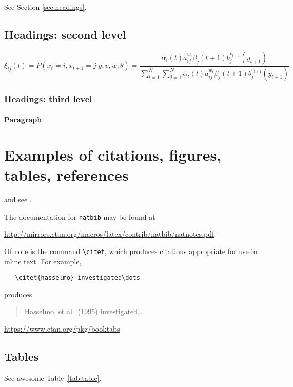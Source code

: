 \documentclass{article}
\begin{document}
\lipsum[4] See Section \ref{sec:headings}.

\subsection{Headings: second level}
\lipsum[5]
\begin{equation}
\xi _{ij}(t)=P(x_{t}=i,x_{t+1}=j|y,v,w;\theta)= {\frac {\alpha _{i}(t)a^{w_t}_{ij}\beta _{j}(t+1)b^{v_{t+1}}_{j}(y_{t+1})}{\sum _{i=1}^{N} \sum _{j=1}^{N} \alpha _{i}(t)a^{w_t}_{ij}\beta _{j}(t+1)b^{v_{t+1}}_{j}(y_{t+1})}}
\end{equation}

\subsubsection{Headings: third level}
\lipsum[6]

\paragraph{Paragraph}
\lipsum[7]

\section{Examples of citations, figures, tables, references}
\label{sec:others}
\lipsum[8] \cite{kour2014real,kour2014fast} and see \cite{hadash2018estimate}.

The documentation for \verb+natbib+ may be found at
\begin{center}
  \url{http://mirrors.ctan.org/macros/latex/contrib/natbib/natnotes.pdf}
\end{center}
Of note is the command \verb+\citet+, which produces citations
appropriate for use in inline text.  For example,
\begin{verbatim}
   \citet{hasselmo} investigated\dots
\end{verbatim}
produces
\begin{quote}
  Hasselmo, et al.\ (1995) investigated\dots
\end{quote}

\begin{center}
  \url{https://www.ctan.org/pkg/booktabs}
\end{center}

\subsection{Tables}
\lipsum[12]
See awesome Table~\ref{tab:table}.
\end{document}
